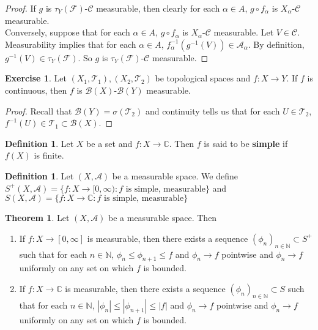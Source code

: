 \documentclass[12pt]{amsart}
\theoremstyle{definition}
\newtheorem{defn}[definition]{Definition}
\newtheorem{thm}[definition]{Theorem}
\newtheorem{ex}[definition]{Exercise}
\newcommand{\al}{\alpha}
\newcommand{\sig}{\sigma}
\newcommand{\C}{\mathbb{C}}
\newcommand{\N}{\mathbb{N}}
\newcommand{\MA}{\mathcal{A}}
\newcommand{\MC}{\mathcal{C}}
\newcommand{\MB}{\mathcal{B}}
\newcommand{\MF}{\mathcal{F}}
\newcommand{\MT}{\mathcal{T}}
\newcommand{\RG}{[0,\infty]}
\newcommand{\Rg}{[0,\infty)}
\newcommand{\lex}[1]{\label{ex:#1}}
\newcommand{\ld}[1]{\label{defn:#1}}
\begin{document}
	\begin{proof}
		If $g$ is $\tau_Y(\MF)$-$\MC$ measurable, then clearly for each $\al \in A$, $g \circ f_{\al}$ is $X_{\al}$-$\MC$ measurable. \\
		Conversely, suppose that for each $\al \in A$, $g \circ f_{\al}$ is $X_{\al}$-$\MC$ measurable. Let $V \in \MC$. Measurability implies that for each $\al \in A$, $f_{\al}^{-1}(g^{-1}(V)) \in \MA_{\al}$. By definition, $g^{-1}(V) \in \tau_Y(\MF)$. So $g$ is $\tau_Y(\MF)$-$\MC$ measurable.
	\end{proof}
	
	\begin{ex} \lex{00000} 
		Let $(X_1,\MT_1), (X_2,\MT_2)$ be topological spaces and $f: X \rightarrow Y$. If $f$ is continuous, then $f$ is $\MB(X)$-$\MB(Y)$ measurable.
	\end{ex}
	
	\begin{proof}
		Recall that $\MB(Y) = \sig(\MT_2)$ and continuity tells us that for each $U \in \MT_2$, $f^{-1}(U) \in \MT_1 \subset \MB(X)$. 
	\end{proof}
	
	\begin{defn} \ld{00000} 
		Let $X$ be a set and $f:X \rightarrow \C$. Then $f$ is said to be \textbf{simple} if $f(X)$ is finite.
	\end{defn}
	
	\begin{defn} \ld{00000} 
		Let $(X,\MA)$ be a measurable space. We define $S^+(X,\MA) = \{f:X \rightarrow \Rg: f \text{ is simple, measurable}\}$ and $S(X,\MA) = \{f: X \rightarrow \C: f \text{ is simple, measurable}\}$
	\end{defn}
	
	\begin{thm}
		Let $(X, \MA)$ be a measurable space. Then 
		\begin{enumerate}
			\item If $f: X \rightarrow \RG$ is measurable, then there exists a sequence $(\phi_n)_{n \in \N} \subset S^+$ such that for each $n \in \N$, $\phi_n \leq \phi_{n+1} \leq f$ and $\phi_n \rightarrow f$ pointwise and $\phi_n \rightarrow f$ uniformly on any set on which $f$ is bounded.
			
			\item If $f: X \rightarrow \C$ is measurable, then there exists a sequence $(\phi_n)_{n \in \N} \subset S$ such that for each $n \in \N$, $|\phi_n| \leq |\phi_{n+1}| \leq |f|$ and $\phi_n \rightarrow f$ pointwise and $\phi_n \rightarrow f$ uniformly on any set on which $f$ is bounded.
		\end{enumerate}
	\end{thm}
	
\end{document}
